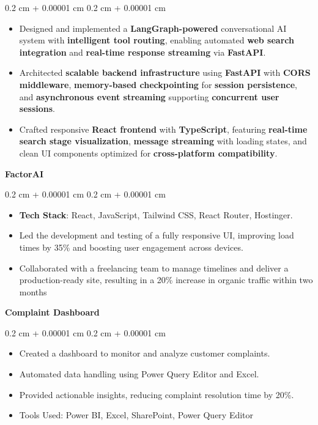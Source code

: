 \documentclass[10pt, letterpaper]{article}
\newenvironment{highlights}{
    \begin{itemize}[
        topsep=0.10 cm,
        parsep=0.10 cm,
        partopsep=0pt,
        itemsep=0pt,
        leftmargin=0.4 cm + 10pt
    ]
}{
    \end{itemize}
} %
\newenvironment{onecolentry}{
    \begin{adjustwidth}{
        0.2 cm + 0.00001 cm
    }{
        0.2 cm + 0.00001 cm
    }
}{
    \end{adjustwidth}
} %
\begin{document}
\vspace{0.15cm}
\begin{onecolentry}
    \begin{highlights}
        \item Designed and implemented a \textbf{LangGraph-powered} conversational AI system with \textbf{intelligent tool routing}, enabling automated \textbf{web search integration} and \textbf{real-time response streaming} via \textbf{FastAPI}.
        \item Architected \textbf{scalable backend infrastructure} using \textbf{FastAPI} with \textbf{CORS middleware}, \textbf{memory-based checkpointing} for \textbf{session persistence}, and \textbf{asynchronous event streaming} supporting \textbf{concurrent user sessions}.
        \item Crafted responsive \textbf{React frontend} with \textbf{TypeScript}, featuring \textbf{real-time search stage visualization}, \textbf{message streaming} with loading states, and clean UI components optimized for \textbf{cross-platform compatibility}.
    \end{highlights}
\end{onecolentry}


\vspace{0.4cm}
\textbf{FactorAI}

\vspace{0.15cm}
\begin{onecolentry}
    \begin{highlights}
     \item  \textbf {Tech Stack}: React, JavaScript, Tailwind CSS, React Router, Hostinger.
      \item Led the development and testing of a fully responsive UI, improving load times by 35\% and boosting user
engagement across devices.
\item Collaborated with a freelancing team to manage timelines and deliver a production-ready site, resulting
in a 20\% increase in organic traffic within two months
    \end{highlights}
\end{onecolentry}

\vspace{0.4cm}
\textbf{Complaint Dashboard}

\vspace{0.15cm}
\begin{onecolentry}
    \begin{highlights}
        \item Created a dashboard to monitor and analyze customer complaints.
        \item Automated data handling using Power Query Editor and Excel.
        \item Provided actionable insights, reducing complaint resolution time by 20\%.
        \item Tools Used: Power BI, Excel, SharePoint, Power Query Editor
    \end{highlights}
\end{onecolentry}
\end{document}
